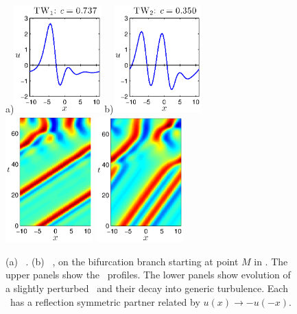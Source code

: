 \begin{figure}[t]
\begin{center}
a)\includegraphics[width=0.3\textwidth]{figs/ks22_TW1_profile.eps}
b)\includegraphics[width=0.3\textwidth]{figs/ks22_TW2_profile.eps}\\
\includegraphics[width=0.3\textwidth]{figs/ks22_TW1_orbit.eps}
\includegraphics[width=0.3\textwidth]{figs/ks22_TW2_orbit.eps}
\end{center}
\caption{
(a)
    \Reqv\ .
(b)
\Reqv\  , on the bifurcation branch starting
at point $M$ in .
The upper panels show
the \reqva\ profiles. The lower panels show evolution
of a slightly perturbed \reqva\ and their decay into generic turbulence.
Each \reqv\ has a reflection symmetric partner related by 
 $u(x) \to -u(-x)$.
} \label{f:ks22TW}
\end{figure}


